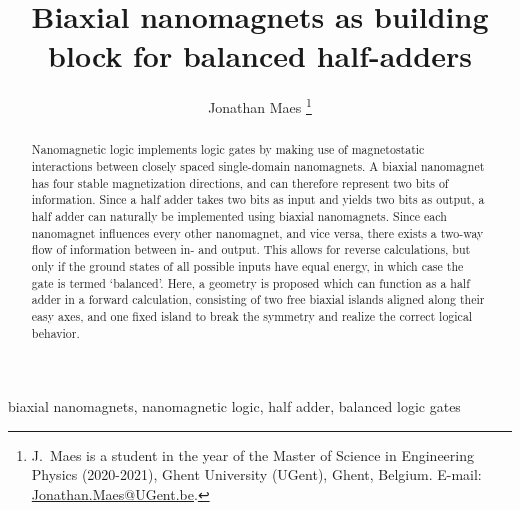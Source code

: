 \documentclass[twocolumn]{phdsymp}
\begin{document}
\title{Biaxial nanomagnets as building block for balanced half-adders}

\author{Jonathan Maes \thanks{J.~Maes is a student in the  year of the Master of Science in Engineering Physics (2020-2021), Ghent University (UGent), Ghent, Belgium. E-mail: \href{mailto:Jonathan.Maes@UGent.be}{Jonathan.Maes@UGent.be}.}}


\maketitle

\begin{abstract}
Nanomagnetic logic implements logic gates by making use of magnetostatic interactions between closely spaced single-domain nanomagnets. A biaxial nanomagnet has four stable magnetization directions, and can therefore represent two bits of information. Since a half adder takes two bits as input and yields two bits as output, a half adder can naturally be implemented using biaxial nanomagnets. Since each nanomagnet influences every other nanomagnet, and vice versa, there exists a two-way flow of information between in- and output. This allows for reverse calculations, but only if the ground states of all possible inputs have equal energy, in which case the gate is termed `balanced'. Here, a geometry is proposed which can function as a half adder in a forward calculation, consisting of two free biaxial islands aligned along their easy axes, and one fixed island to break the symmetry and realize the correct logical behavior.  %
\end{abstract}

\begin{keywords}
biaxial nanomagnets, nanomagnetic logic, half adder, balanced logic gates
\end{keywords}
\end{document}

